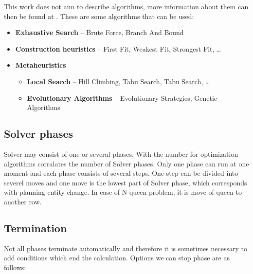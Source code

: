 This work does not aim to describe algorithms, more information about them can then be found at \cite{OptaPlannerDoc}. These are some algorithms that can be used:
\begin{itemize}
\item \textbf{Exhaustive Search} -- Brute Force,  Branch And Bound
\item \textbf{Construction heuristics} --  First Fit, Weakest Fit,  Strongest Fit, \dots
\item \textbf{Metaheuristics}
\begin{itemize}
\item \textbf{Local Search} --  Hill Climbing, Tabu Search, Tabu Search, \dots
\item \textbf{Evolutionary Algorithms} -- Evolutionary Strategies, Genetic Algorithms
\end{itemize}
\end{itemize}

\subsection{Solver phases}
Solver may consist of one or several phases. With the number for optimization algorithms corralates the number of Solver phases. Only one phase can run at one moment and each phase consists of several steps. One step can be divided into severel moves and one move is the lowest part of Solver phase, which corresponds with planning entity change. In case of N-queen problem, it is move of queen to another row.

\subsection{Termination}
Not all phases terminate automatically and therefore it is sometimes necessary to add conditions which end the calculation. Options we can stop phase are as follows:

